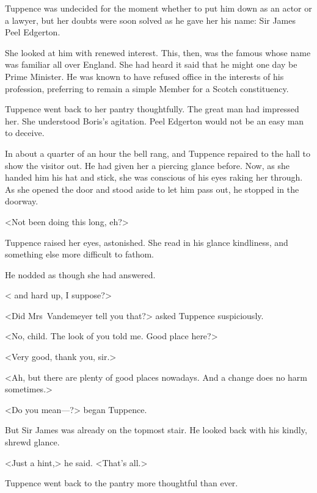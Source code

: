 Tuppence was undecided for the moment whether to put him down as an actor or a lawyer, but her doubts were soon solved as he gave her his name: Sir James Peel Edgerton.

She looked at him with renewed interest. This, then, was the famous  whose name was familiar all over England. She had heard it said that he might one day be Prime Minister. He was known to have refused office in the interests of his profession, preferring to remain a simple Member for a Scotch constituency.

Tuppence went back to her pantry thoughtfully. The great man had impressed her. She understood Boris's agitation. Peel Edgerton would not be an easy man to deceive.

In about a quarter of an hour the bell rang, and Tuppence repaired to the hall to show the visitor out. He had given her a piercing glance before. Now, as she handed him his hat and stick, she was conscious of his eyes raking her through. As she opened the door and stood aside to let him pass out, he stopped in the doorway.

<Not been doing this long, eh?>

Tuppence raised her eyes, astonished. She read in his glance kindliness, and something else more difficult to fathom.

He nodded as though she had answered.

< and hard up, I suppose?>

<Did Mrs~Vandemeyer tell you that?> asked Tuppence suspiciously.

<No, child. The look of you told me. Good place here?>

<Very good, thank you, sir.>

<Ah, but there are plenty of good places nowadays. And a change does no harm sometimes.>

<Do you mean—?> began Tuppence.

But Sir James was already on the topmost stair. He looked back with his kindly, shrewd glance.

<Just a hint,> he said. <That's all.>

Tuppence went back to the pantry more thoughtful than ever. 